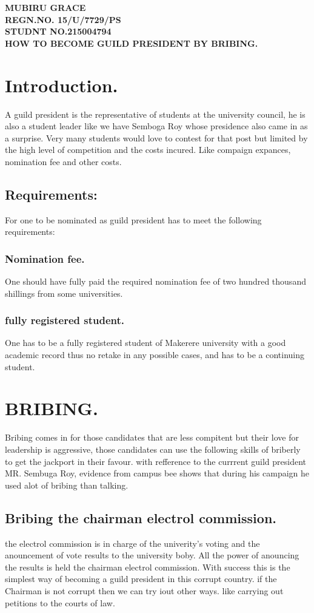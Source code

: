 \documentclass[options]{article}
\begin{document}
\textbf{MUBIRU GRACE\\}
\textbf{REGN.NO. 15/U/7729/PS\\}
\textbf{STUDNT NO.215004794\\}
\textbf{HOW TO BECOME GUILD PRESIDENT   BY BRIBING.}
\section{\textbf{Introduction.}}
A guild president is the representative of students at the university council, he is also a student leader like we have Semboga Roy whose presidence also came in as a surprise. Very many students would love to contest for that post but limited by the high level of competition and the costs incured. Like compaign expances, nomination fee and other costs.
\subsection{Requirements:}
For one to be nominated as guild president has to meet the following requirements:
\subsubsection{Nomination fee.}
One should have fully paid the required nomination fee of two hundred thousand shillings from some universities.
\subsubsection{fully registered student.}
One has to be a fully registered student of Makerere university with a good academic record thus no retake in any possible cases,
and has to be a continuing student.
\section{BRIBING.}
Bribing comes in for those candidates that are less compitent but their love for leadership is aggressive, those candidates can use the following skills of briberly to get the jackport in their favour.
with refference to the currrent guild president MR. Sembuga Roy,  evidence from campus bee shows that during his campaign he used alot of bribing than talking.
\subsection{Bribing the chairman electrol commission.}
the electrol commission is in charge of the univerity's voting and the anouncement of vote results to the university boby. All the power of anouncing the results is held the chairman electrol commission. With success this is the simplest way of becoming a guild president in this corrupt country. if the Chairman is not corrupt then we can try iout other ways. like  carrying out petitions to the courts of law.
\end{document}
